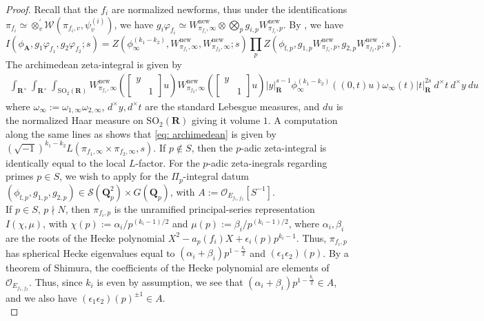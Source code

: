 \documentclass{amsart}
\theoremstyle{plain}
\theoremstyle{plain}
\theoremstyle{remark}
\begin{document}
\begin{proof}
    Recall that the $f_i$ are normalized newforms, thus under the identifications $\pi_{f_i}\simeq\otimes_v^{'}\mathcal{W}(\pi_{f_i,v},\psi_v^{(i)})$, we have $g_i\varphi_{f_i}\simeq W_{\pi_{f_i},\infty}^\mathrm{new}\otimes \bigotimes_pg_{i,p}W_{\pi_{f_i},p}^\mathrm{new}$. By \cite{jacquet1981euler}, we have $$I(\phi_\mathbf{A},g_1\varphi_{f_1},g_2\varphi_{f_2};s)=Z(\phi_\infty^{(k_1-k_2)},W_{\pi_{f_1},\infty}^\mathrm{new},W_{\pi_{f_2},\infty}^\mathrm{new};s)\prod_p Z(\phi_{\mathrm{f},p},g_{1,p}W_{\pi_{f_1},p}^\mathrm{new}, g_{2,p}W_{\pi_{f_2},p}^\mathrm{new};s).$$
    The archimedean zeta-integral is given by 
    \begin{align}\label{eq: archimedean}\int_{\mathbf{R}^\times}\int_{\mathbf{R}^\times}\int_{\mathrm{SO}_2(\mathbf{R})}W_{\pi_{f_1},\infty}^\mathrm{new}(\left[\begin{smallmatrix}
        y & \\
        & 1
    \end{smallmatrix}\right]u)W_{\pi_{f_2},\infty}^\mathrm{new}(\left[\begin{smallmatrix}
        y & \\
        & 1
    \end{smallmatrix}\right]u)|y|_\mathbf{R}^{s-1}\phi_\infty^{(k_1-k_2)}((0,t)u)\omega_\infty(t)|t|_\mathbf{R}^{2s}\ d^\times t\ d^\times y\ du\end{align}
    where $\omega_\infty:=\omega_{1,\infty}\omega_{2,\infty}$, $d^\times y,d^\times t$ are the standard Lebesgue measures, and $du$ is the normalized Haar measure on $\mathrm{
    SO}_2(\mathbf{R})$ giving it volume $1$. A computation along the same lines as \cite[Proposition $5.3$]{chen2020primitive} shows that \eqref{eq: archimedean} is given by $(\sqrt{-1})^{k_1-k_2}L(\pi_{f_1,\infty}\times\pi_{f_2,\infty},s)$. If $p\notin S$, then the $p$-adic zeta-integral is identically equal to the local $L$-factor. For the $p$-adic zeta-inegrals regarding primes $p\in S$, we wish to apply  for the $\Pi_p$-integral datum $(\phi_{\mathrm{f},p},g_{1,p},g_{2,p})\in \mathcal{S}(\mathbf{Q}_p^2)\times G(\mathbf{Q}_p)$, with $A:=\mathcal{O}_{E_{f_1,f_2}}[S ^{-1}]$.\\
    If $p\in S$, $p\nmid N$, then $\pi_{f_i,p}$ is the unramified principal-series representation $I(\chi,\mu)$, with $\chi(p):=\alpha_i/p^{(k_i-1)/2}$ and $\mu(p):=\beta_i/p^{(k_i-1)/2}$, where $\alpha_i,\beta_i$ are the roots of the Hecke polynomial $X^2-a_p(f_i)X+\epsilon_i(p)p^{k_i-1}.$ Thus, $\pi_{f_i,p}$ has spherical Hecke eigenvalues equal to $(\alpha_i +\beta_i)p^{1-\tfrac{k_i}{2}}$ and $(\epsilon_1\epsilon_2)(p)$. By a theorem of Shimura, the coefficients of the Hecke polynomial are elements of $\mathcal{O}_{E_{f_1,f_2}}$. Thus, since $k_i$ is even by assumption, we see that $(\alpha_i +\beta_i)p^{1-\tfrac{k_i}{2}}\in A$, and we also have $(\epsilon_1\epsilon_2)(p)^{\pm 1}\in A$.\\

\end{proof}
\end{document}
